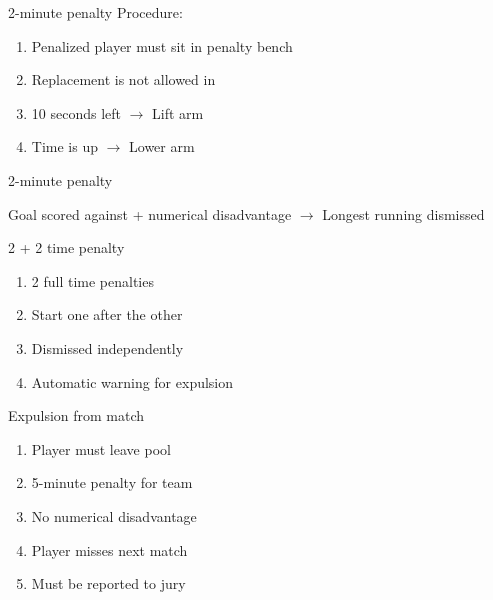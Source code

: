 \begin{frame}{2-minute penalty}
    Procedure:

    \begin{enumerate}
        \item Penalized player must sit in penalty bench
        \item Replacement is not allowed in
        \item 10 seconds left $\rightarrow$ Lift arm
        \item Time is up $\rightarrow$ Lower arm
    \end{enumerate}
\end{frame}

\begin{frame}{2-minute penalty}
    \begin{center}
        Goal scored against + numerical disadvantage $\rightarrow$ Longest running dismissed
    \end{center}
\end{frame}

\begin{frame}{2 + 2 time penalty}
    \begin{enumerate}
        \item 2 full time penalties
        \item Start one after the other
        \item Dismissed independently
        \item Automatic warning for expulsion
    \end{enumerate}
\end{frame}

\begin{frame}{Expulsion from match}
    \begin{enumerate}
        \item Player must leave pool
        \item 5-minute penalty for team
        \item No numerical disadvantage
        \item Player misses next match
        \item Must be reported to jury
    \end{enumerate}
\end{frame}